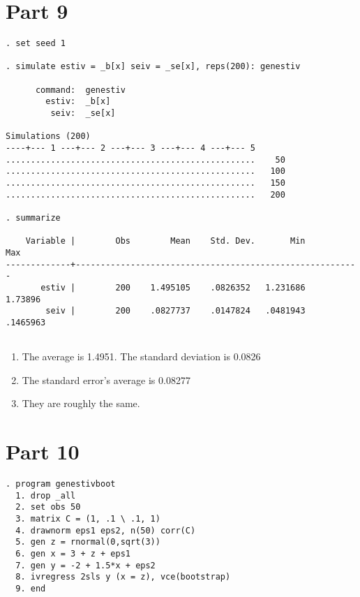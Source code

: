 \documentclass{article}
\begin{document}
\section{Part 9}
\begin{lstlisting}
. set seed 1

. simulate estiv = _b[x] seiv = _se[x], reps(200): genestiv

      command:  genestiv
        estiv:  _b[x]
         seiv:  _se[x]

Simulations (200)
----+--- 1 ---+--- 2 ---+--- 3 ---+--- 4 ---+--- 5 
..................................................    50
..................................................   100
..................................................   150
..................................................   200

. summarize

    Variable |        Obs        Mean    Std. Dev.       Min        Max
-------------+---------------------------------------------------------
       estiv |        200    1.495105    .0826352   1.231686    1.73896
        seiv |        200    .0827737    .0147824   .0481943   .1465963
        
\end{lstlisting}

\begin{enumerate}[label=(\alph*)]
\item The average is 1.4951. The standard deviation is 0.0826
\item The standard error's average is 0.08277
\item They are roughly the same. 
\end{enumerate}

\section{Part 10}
\begin{lstlisting}
. program genestivboot
  1. drop _all
  2. set obs 50
  3. matrix C = (1, .1 \ .1, 1)
  4. drawnorm eps1 eps2, n(50) corr(C)
  5. gen z = rnormal(0,sqrt(3))
  6. gen x = 3 + z + eps1
  7. gen y = -2 + 1.5*x + eps2
  8. ivregress 2sls y (x = z), vce(bootstrap)
  9. end

\end{lstlisting}
\end{document}
